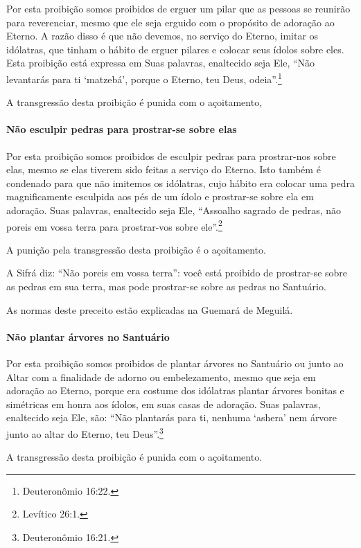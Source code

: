 Por esta proibição somos proibidos de erguer um pilar que as pessoas se
reunirão para reverenciar, mesmo que ele seja erguido com o propósito de
adoração ao Eterno. A razão disso é que não devemos, no serviço do
Eterno, imitar os idólatras, que tinham o hábito de erguer pilares e
colocar seus ídolos sobre eles. Esta proibição está expressa em Suas
palavras, enaltecido seja Ele, ``Não levantarás para ti `matzebá',
porque o Eterno, teu Deus, odeia''.\footnote{Deuteronômio 16:22.}

A transgressão desta proibição é punida com o açoitamento,

\paragraph{Não esculpir pedras para prostrar-se sobre elas}

Por esta proibição somos proibidos de esculpir pedras para prostrar-nos
sobre elas, mesmo se elas tiverem sido feitas a serviço do Eterno. Isto
também é condenado para que não imitemos os idólatras, cujo hábito era
colocar uma pedra magnificamente esculpida aos pés de um ídolo e prostrar-se
sobre ela em adoração. Suas palavras, enaltecido seja Ele, ``Assoalho
sagrado de pedras, não poreis em vossa terra para prostrar-vos sobre
ele''.\footnote{Levítico 26:1.}

A punição pela transgressão desta proibição é o açoitamento.

A Sifrá diz: ``Não poreis em vossa terra'': você está proibido de
prostrar-se sobre as pedras em sua terra, mas pode prostrar-se sobre as
pedras no Santuário.

As normas deste preceito estão explicadas na Guemará de Meguilá.

\paragraph{Não plantar árvores no Santuário}

Por esta proibição somos proibidos de plantar árvores no Santuário ou
junto ao Altar com a finalidade de adorno ou embelezamento, mesmo que
seja em adoração ao Eterno, porque era costume dos idólatras plantar
árvores bonitas e simétricas em honra aos ídolos, em suas casas de
adoração. Suas palavras, enaltecido seja Ele, são: ``Não plantarás para
ti, nenhuma `ashera' nem árvore junto ao altar do Eterno, teu Deus''.\footnote{Deuteronômio 16:21.}

A transgressão desta proibição é punida com o açoitamento.

